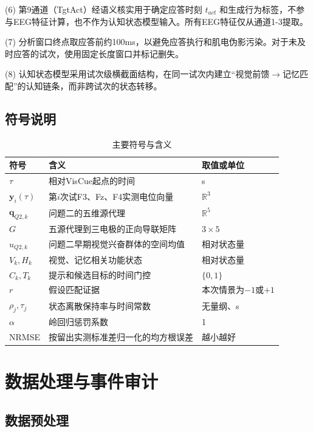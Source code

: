 \documentclass[UTF8,a4paper,12pt]{ctexart}
\begin{document}
(6) 第9通道（TgtAct）经语义核实用于确定应答时刻 \(t_{act}\) 和生成行为标签，不参与EEG特征计算，也不作为认知状态模型输入。所有EEG特征仅从通道1-3提取。

(7) 分析窗口终点取应答前约100ms，以避免应答执行和肌电伪影污染。对于未及时应答的试次，使用固定长度窗口并标记删失。

(8) 认知状态模型采用试次级横截面结构，在同一试次内建立“视觉前馈$\rightarrow$记忆匹配”的认知链条，而非跨试次的状态转移。

\subsection{符号说明}

\begin{table}[H]
\centering
\caption{主要符号与含义}
\begin{tabular}{lll}
\toprule
符号 & 含义 & 取值或单位 \\
\midrule
\(\tau\) & 相对VisCue起点的时间 & s \\
\(\mathbf{y}_i(\tau)\) & 第\(i\)次试F3、Fz、F4实测电位向量 & \(\mathbb{R}^3\) \\
\(\mathbf{q}_{Q2,k}\) & 问题二的五维源代理 & \(\mathbb{R}^5\) \\
\(G\) & 五源代理到三电极的正向导联矩阵 & \(3\times 5\) \\
\(u_{Q2,k}\) & 问题二早期视觉兴奋群体的空间均值 & 相对状态量 \\
\(V_k, H_k\) & 视觉、记忆相关功能状态 & 相对状态量 \\
\(C_k, T_k\) & 提示和候选目标的时间门控 & \(\{0,1\}\) \\
\(r\) & 假设匹配证据 & 本次情景为$-1$或$+1$ \\
\(\rho_j, \tau_j\) & 状态离散保持率与时间常数 & 无量纲、s \\
\(\alpha\) & 岭回归惩罚系数 & 1 \\
NRMSE & 按留出实测标准差归一化的均方根误差 & 越小越好 \\
\bottomrule
\end{tabular}
\end{table}

\section{数据处理与事件审计}

\subsection{数据预处理}
\end{document}
